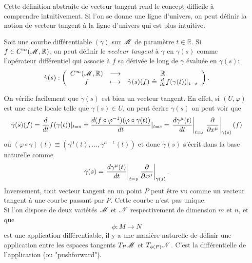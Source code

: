 \documentclass[a4paper,11pt]{report}
\begin{document}
                Cette définition abstraite de vecteur tangent rend le concept difficile à comprendre intuitivement. Si l'on se donne une ligne d'univers, on peut définir la notion de vecteur tangent à la ligne d'univers qui est plus intuitive.
                \begin{definition}
                    Soit une courbe différentiable $(\gamma)$ sur $\mathscr{M}$ de paramètre $t\in\mathbb{R}$. Si $f\in C^\infty(\mathscr{M},\mathbb{R})$, on peut définir le \textit{vecteur tangent} à $\gamma$ en $\gamma(s)$ comme l'opérateur différentiel qui associe à $f$ sa dérivée le long de $\gamma$ évaluée en $\gamma(s)$:
                    \begin{equation}
                    \dot{\gamma}(s):\left(
                    \begin{array}{ccc}
                        C^\infty(\mathscr{M},\mathbb{R}) & \longrightarrow & \mathbb{R} \\
                        f & \longmapsto &\dot{\gamma}(s)(f) ~\hat{=}~ \frac{d}{dt}f(\gamma(t))|_{t=s}
                    \end{array}
                    \right).
                    \end{equation}
                \end{definition}
                
                On vérifie facilement que $\dot{\gamma}(s)$ est bien un vecteur tangent. En effet, si $(U,\varphi)$ est une carte locale telle que $\gamma(s)\in U$, on peut écrire $\dot{\gamma}(s)$ on peut voir que
                \begin{equation}
                    \dot{\gamma}(s)(f) = \frac{d}{dt}f(\gamma(t))|_{t=s}= \frac{d(f\circ\varphi^{-1})(\varphi\circ\gamma(t))}{dt}|_{t=s}= \eval{\frac{d\gamma^\mu(t)}{dt}}_{t=s}\eval{\pdv{}{x^\mu}}_{\gamma(s)}(f)
                \end{equation}
                où $(\varphi\circ\gamma)(t)\equiv(\gamma^0(t),\dots,\gamma^{n-1}(t))$ et donc $\dot{\gamma}(s)$ s'écrit dans la base naturelle comme
                \begin{equation}
                     \dot{\gamma}(s) =  \eval{\frac{d\gamma^\mu(t)}{dt}}_{t=s}\eval{\pdv{}{x^\mu}}_{\gamma(s)}.
                \end{equation}
                Inversement, tout vecteur tangent en un point $P$ peut être vu comme un vecteur tangent à une courbe passant par $P$. Cette courbe n'est pas unique.\\
                
                Si l'on dispose de deux variétés $\mathscr{M}$ et $\mathscr{N}$ respectivement de dimension $m$ et $n$, et que 
                \begin{equation*}
                    \phi : M\to N
                \end{equation*}
                est une application différentiable, il y a une manière naturelle de définir une application entre les espaces tangents $T_P\mathscr{M}$ et $T_{\phi(P)}\mathscr{N}$. C'est la différentielle de l'application (ou "pushforward").
                
\end{document}
